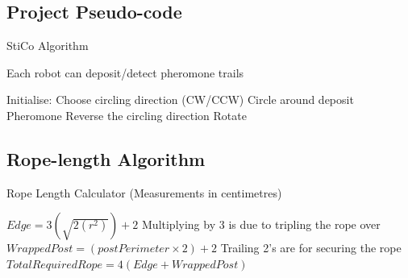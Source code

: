 \subsection{Project Pseudo-code}
\begin{algorithm}
  \caption{StiCo Algorithm\cite{Ranjbar-Sahraei2012Demo} }
  \label{desSysPseuStiCo}
  \begin{algorithmic}[1]
    \Require Each robot can deposit/detect pheromone trails \par
    \State Initialise: Choose circling direction (CW/CCW)
    \Loop
    \State Circle around
    \State deposit Pheromone
    \EndWhile
    \State Reverse the circling direction
    \Else
    \State Rotate
    \EndWhile
    \EndIf
    \EndLoop
  \end{algorithmic}
\end{algorithm}

\subsection{Rope-length Algorithm}
\begin{algorithm}
  \caption{Rope Length Calculator (Measurements in centimetres) }
  \label{desSysRope}
  \begin{algorithmic}[1]
    \State $ Edge = 3(\sqrt{2(r^{2} ) } ) + 2 $
    \Comment Multiplying by 3 is due to tripling the rope over
    \State $ WrappedPost = (postPerimeter \times 2) + 2 $
    \Comment Trailing 2's are for securing the rope
    \State $ TotalRequiredRope = 4(Edge + WrappedPost) $
  \end{algorithmic}
\end{algorithm}
\clearpage

